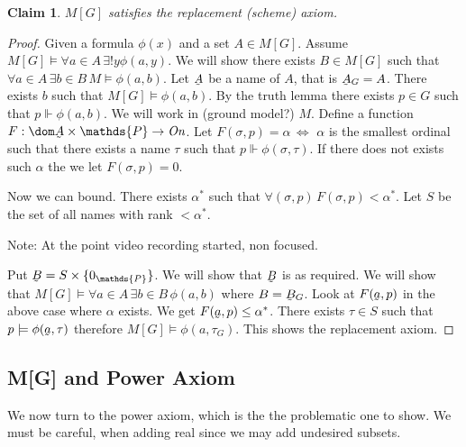 \documentclass[11pt,pdftex,twoside,a4paper]{article}
\newcommand{\dsP}{\ensuremath{\mathds{P}}}
\newcommand{\forces}{\ensuremath{\Vdash}}
\newcommand{\On}{\ensuremath{\mathit{On}}}
\newcommand{\utilde}[1]{\ensuremath{\underaccent{\tilde}{#1}}}
\newtheorem{claim}[thm]{Claim}
\theoremstyle{definition}
\begin{document}
\begin{claim}
\(M[G]\) satisfies the replacement (scheme) axiom.
\end{claim}
\begin{proof}
Given a formula \(\phi(x)\) and a set \(A\in M[G]\).
Assume \(M[G]\models \forall a\in A\,\exists! y \phi(a,y)\).
We will show there exists \(B\in M[G]\) such that
\(\forall a\in A\,\exists b\in B\, M\models \phi(a,b)\).
Let \utilde{A} be a name of $A$, that is \(\utilde{A}_G = A\).
There exists $b$ such that \(M[G]\models \phi(a,b)\).
By the truth lemma there exists \(p \in G\) such that \(p\forces \phi(a, b)\).
We will work in (ground model?) $M$.
Define a function \(F:\dom \utilde{A}\times\dsP\to\On\).
Let \(F(\sigma,p)=\alpha\,\Leftrightarrow\)
\(\alpha\) is the smallest ordinal such that there exists a name \(\tau\)
such that \(p\forces \phi(\sigma,\tau)\).
If there does not exists such \(\alpha\) the we let \(F(\sigma,p)=0\).

Now we can bound. There exists \(\alpha^*\) such that
\(\forall (\sigma,p)\, F(\sigma,p)<\alpha^*\).
Let $S$ be the set of all names with rank \(<\alpha^*\).

{\small Note: At the point video recording started, non focused.}

Put \(\utilde{B} = S\times\{0_\dsP\}\).
We will show that \utilde{B} is as required.
We will show that
\(M[G]\models \forall a\in A\,\exists b\in B\,\phi(a,b)\)
where \(B=\utilde{B}_G\).
Look at \(F(\utilde{a},p)\) in the above case where \(\alpha\) exists.
We get \(F(\utilde{a},p)\leq \alpha^*\).
There exists \(\tau\in S\) such that \(p\models \phi(\utilde{a},\tau)\)
therefore \(M[G]\models \phi(a,\tau_G)\).
This shows the replacement axiom.
\end{proof}

\subsection{M[G] and Power Axiom}

We now turn to the power axiom, which is the the problematic one to show.
We must be careful, when adding real since we may
add undesired subsets.
\end{document}
